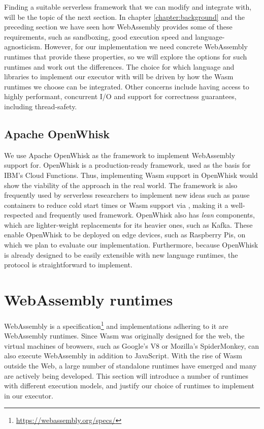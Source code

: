 Finding a suitable serverless framework that we can modify and integrate with, will be the topic of the next section. In chapter \ref{chapter:background} and the preceding section we have seen how WebAssembly provides some of these requirements, such as sandboxing, good execution speed and language-agnosticism. However, for our implementation we need concrete WebAssembly runtimes that provide these properties, so we will explore the options for such runtimes and work out the differences. The choice for which language and libraries to implement our executor with will be driven by how the Wasm runtimes we choose can be integrated. Other concerns include having access to highly performant, concurrent I/O and support for correctness guarantees, including thread-safety.

\subsection{Apache OpenWhisk}

We use Apache OpenWhisk as the framework to implement WebAssembly support for. OpenWhisk is a production-ready framework, used as the basis for IBM's Cloud Functions. Thus, implementing Wasm support in OpenWhisk would show the viability of the approach in the real world. The framework is also frequently used by serverless researchers to implement new ideas such as pause containers to reduce cold start times \cite{Mohan2019} or Wasm support via  \cite{Hall2019}, making it a well-respected and frequently used framework. OpenWhisk also has \emph{lean} components, which are lighter-weight replacements for its heavier ones, such as Kafka. These enable OpenWhisk to be deployed on edge devices, such as Raspberry Pis, on which we plan to evaluate our implementation. Furthermore, because OpenWhisk is already designed to be easily extensible with new language runtimes, the protocol is straightforward to implement.

\section{WebAssembly runtimes}
\label{section:wasm-runtimes}

WebAssembly is a specification\footnote{\url{https://webassembly.org/specs/}} and implementations adhering to it are WebAssembly runtimes. Since Wasm was originally designed for the web, the virtual machines of browsers, such as Google's V8 or Mozilla's SpiderMonkey, can also execute WebAssembly in addition to JavaScript. With the rise of Wasm outside the Web, a large number of standalone runtimes have emerged and many are actively being developed. This section will introduce a number of runtimes with different execution models, and justify our choice of runtimes to implement in our executor.


